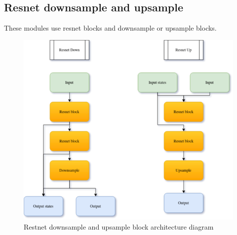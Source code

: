 \documentclass[11pt,a4paper]{report}
\begin{document}
\subsection{Resnet downsample and upsample}
These modules use resnet blocks and downsample or upsample blocks.
\begin{figure}[H]
	\centering
	\includegraphics[scale=0.6]{images/ResnetDownUp.drawio}
    \caption{Restnet downsample and upsample block architecture diagram}
\end{figure}
\end{document}
